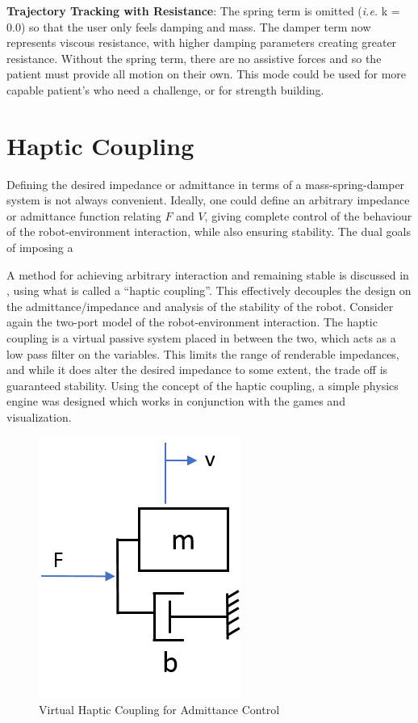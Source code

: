\documentclass[12pt]{report}
\begin{document}
	\textbf{Trajectory Tracking with Resistance}: The spring term is omitted (\textit{i.e.} k = 0.0) so that the user only feels damping and mass. The damper term now represents viscous resistance, with higher damping parameters creating greater resistance. Without the spring term, there are no assistive forces and so the patient must provide all motion on their own. This mode could be used for more capable patient's who need a challenge, or for strength building. 
	
	

	\section{Haptic Coupling} \label{sec:haptic}
%

Defining the desired impedance or admittance in terms of a mass-spring-damper system is not always convenient. Ideally, one could define an arbitrary impedance or admittance function relating $F$ and $V$, giving complete control of the behaviour of the robot-environment interaction, while also ensuring stability. The dual goals of imposing a 
	
	A method for achieving arbitrary interaction and remaining stable is discussed in \cite{Adams1999}, using what is called a ``haptic coupling''. This effectively decouples the design on the admittance/impedance and analysis of the stability of the robot. Consider again the two-port model of the robot-environment interaction. The haptic coupling is a virtual passive system placed in between the two, which acts as a low pass filter on the variables. This limits the range of renderable impedances, and while it does alter the desired impedance to some extent, the trade off is guaranteed stability. Using the concept of the haptic coupling, a simple physics engine was designed which works in conjunction with the games and visualization.
	
	\begin{figure}[h] 
		\centering
		\includegraphics[width=0.3\linewidth]{haptic_coupling}
		\caption{Virtual Haptic Coupling for Admittance Control}
		\label{fig:haptic_coupling}
	\end{figure} 
	
\end{document}
